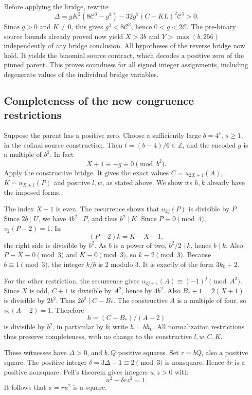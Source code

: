 Before applying the bridge, rewrite
\[
\Delta=gK^2(8\mathcal C^3-g^3)-32g^2(C-KL)^2\mathcal C^3>0.
\]
Since $g>0$ and $K\ne0$, this gives $g^3<8\mathcal C^3$, hence $0<g<2\mathcal C$. The pre-binary source bounds already proved now yield $X>3b$ and $Y>\max(b,256)$ independently of any bridge conclusion. All hypotheses of the reverse bridge now hold. It yields the binomial
source contract, which decodes a positive zero of the pinned parent.
This proves soundness for all signed integer assignments, including
degenerate values of the individual bridge variables.

\subsection{Completeness of the new congruence
restrictions}\label{completeness-of-the-new-congruence-restrictions}

Suppose the parent has a positive zero. Choose a sufficiently large
\(b=4^s\), \(s\ge1\), in the cofinal source construction. Then
\(t=(b-4)/6\in\mathbb Z\), and the encoded \(g\) is a multiple of
\(b^2\). In fact \[
 X+1\equiv-g\equiv0\pmod{b^2}.
\] Apply the constructive bridge. It gives the exact values
\(C=u_{2X+1}(A)\), \(K=u_{X+1}(P)\) and positive \(l,w\), as stated
above. We show its \(h,k\) already have the imposed forms.

The index \(X+1\) is even. The recurrence shows that \(u_{2j}(P)\) is
divisible by \(P\). Since \(2b\mid U\), we have \(4b^2\mid P\), and thus
\(b^2\mid K\). Since \(P\equiv0\pmod4\), \(v_2(P-2)=1\). In \[
 (P-2)k=K-X-1,
\] the right side is divisible by \(b^2\). As \(b\) is a power of two,
\(b^2/2\mid k\), hence \(b\mid k\). Also \(P\equiv X\equiv0\pmod3\) and
\(K\equiv0\pmod3\), so \(k\equiv2\pmod3\). Because \(b\equiv1\pmod3\),
the integer \(k/b\) is 2 modulo 3. It is exactly of the form \(3k_0+2\).

For the other restriction, the recurrence gives
\(u_{2j+1}(A)\equiv(-1)^j\pmod{A^2}\). Since \(X\) is odd, \(C+1\) is
divisible by \(A^2\), hence by \(4b^2\). Also \(B_*+1=2(X+1)\) is
divisible by \(2b^2\). Thus \(2b^2\mid C-B_*\). The constructive \(A\)
is a multiple of four, so \(v_2(A-2)=1\). Therefore \[
 h=(C-B_*)/(A-2)
\] is divisible by \(b^2\), in particular by \(b\); write \(h=bh_0\).
All normalization restrictions thus preserve completeness, with no
change to the constructive \(l,w,C,K\).

These witnesses have \(\Delta>0\), and \(b,Q\) positive squares. Set
\(r=bQ\), also a positive square. The positive integer
\(\delta=3\Delta-1\equiv2\pmod3\) is nonsquare. Hence \(\delta r\) is a
positive nonsquare. Pell's theorem gives integers \(u,z>0\) with \[
 u^2-\delta r z^2=1.
\] It follows that \(a=ru^2\) is a square.

